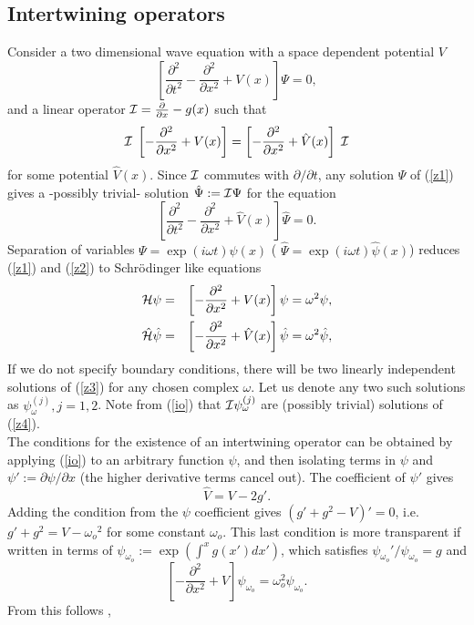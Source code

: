 \documentclass[aps,floats,showpacs,amssymb,tightenlines]{revtex4}
\def\w{\omega}
\def\p{\partial}
\def\I{{\cal I}}
\def\po{\psi_{\w_o}}
\begin{document}
\subsection{Intertwining operators} \label{inter}

Consider a two dimensional wave  equation with a space dependent potential $V$
\begin{equation} \label{z1}
\left[ \frac{\p^2 }{\p t^2} - \frac{\p^2 }{\p x^2} + V(x) \right] \Psi = 0,
\end{equation}
and a linear operator $\I= \frac{\p}{\p x} -g(x)$ such that \cite{price}
\begin{equation} \label{io}
\I \; \left[ - \frac{\p^2 }{\p x^2} + V(x) \right]  =   \left[ - \frac{\p^2 }{\p x^2} + \hat V(x) \right] \; \I
\end{equation}
for some potential $\hat V(x)$. Since $\I$  commutes with $\p /\p t$, any solution $\Psi$ of (\ref{z1})  gives a -possibly trivial- solution $\hat \Psi := \I \Psi$ for the equation
\begin{equation} \label{z2}
\left[ \frac{\p^2 }{\p t^2} - \frac{\p^2 }{\p x^2} + \hat V(x)
\right] \hat \Psi = 0.
\end{equation}
Separation of variables $\Psi = \exp(i\w t) \psi(x)$
  ( $\hat \Psi = \exp(i\w t) \hat \psi(x)$) reduces (\ref{z1})
and (\ref{z2})  to   Schr\"odinger like
equations
\begin{eqnarray} \label{z3}
{\cal H} \psi  &=& \left[ - \frac{\p^2 }{\p x^2} + V(x) \right] \psi = \w ^2 \psi ,\\
\hat {\cal H} \hat \psi &=& \left[ - \frac{\p^2 }{\p x^2} + \hat
V(x) \right] \hat \psi = \w ^2 \hat \psi , \label{z4}
\end{eqnarray}
If we do not specify boundary conditions, there will be
two linearly independent solutions of (\ref{z3}) for any chosen
complex $\w$. Let us   denote any two such solutions  as $\psi_{\w}^{(j)}, j=1,2$. Note from (\ref{io}) that
 $ \I \psi _{\w}^{(j)}$ are (possibly trivial) solutions of  (\ref{z4}).\\
The conditions for the existence of an intertwining operator can be
obtained
 by applying (\ref{io}) to an
arbitrary function $\psi$, and then isolating  terms in $\psi$ and $\psi' := \p \psi / \p x$ (the higher derivative terms
cancel out).
The coefficient of $\psi'$ gives
\begin{equation} \label{vh}
\hat V = V - 2 g' .
\end{equation}
Adding the condition from the  $\psi$ coefficient gives $(g' + g^2-V)' = 0$, i.e.
$g'+g^2=V-\w_o{}^2$ for some constant $\w_o$. This last condition is
more transparent if written in terms of  $\po :=\exp (\int^x g(x') dx' )$, which satisfies $\po'/\po=g$ and
\begin{equation} \label{zz}
\left[ - \frac{\p^2 }{\p x^2} + V \right] \po = \w_o ^2 \po .
\end{equation}
From this follows \cite{price},
\end{document}
